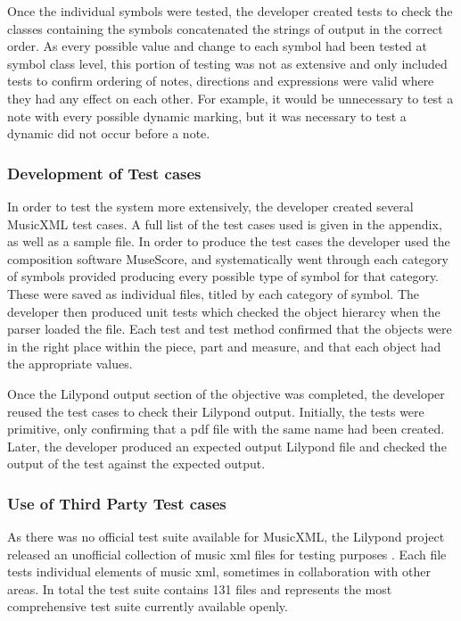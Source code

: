 Once the individual symbols were tested, the developer created tests to check the classes containing the symbols concatenated the strings of output in the correct order. As every possible value and change to each symbol had been tested at symbol class level, this portion of testing was not as extensive and only included tests to confirm ordering of notes, directions and expressions were valid where they had any effect on each other. For example, it would be unnecessary to test a note with every possible dynamic marking, but it was necessary to test a dynamic did not occur before a note.


\subsubsection{Development of Test cases}
In order to test the system more extensively, the developer created several MusicXML test cases. A full list of the test cases used is given in the appendix, as well as a sample file. In order to produce the test cases the developer used the composition software MuseScore, and systematically went through each category of symbols provided producing every possible type of symbol for that category. These were saved as individual files, titled by each category of symbol.
The developer then produced unit tests which checked the object hierarcy when the parser loaded the file. Each test and test method confirmed that the objects were in the right place within the piece, part and measure, and that each object had the appropriate values.

Once the Lilypond output section of the objective was completed, the developer reused the test cases to check their Lilypond output. Initially, the tests were primitive, only confirming that a pdf file with the same name had been created. Later, the developer produced an expected output Lilypond file and checked the output of the test against the expected output.

\subsubsection{Use of Third Party Test cases}
As there was no official test suite available for MusicXML, the Lilypond project released an unofficial collection of music xml files for testing purposes \parencite{LilypondTestcase}. Each file tests individual elements of music xml, sometimes in collaboration with other areas. In total the test suite contains 131 files and represents the most comprehensive test suite currently available openly.

